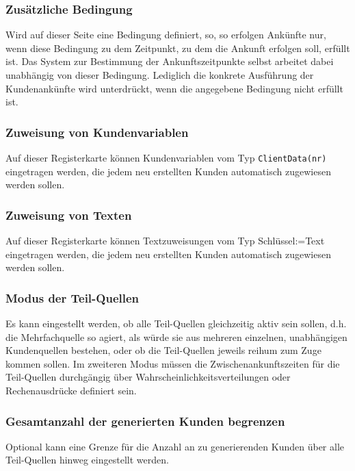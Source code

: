 \subsubsection*{Zusätzliche Bedingung}

Wird auf dieser Seite eine Bedingung definiert, so, so erfolgen Ankünfte nur, wenn diese Bedingung
zu dem Zeitpunkt, zu dem die Ankunft erfolgen soll, erfüllt ist.
Das System zur Bestimmung der Ankunftszeitpunkte selbst arbeitet dabei unabhängig von dieser Bedingung.
Lediglich die konkrete Ausführung der Kundenankünfte wird unterdrückt, wenn die angegebene Bedingung nicht erfüllt ist.

\subsubsection*{Zuweisung von Kundenvariablen}

Auf dieser Registerkarte können Kundenvariablen vom Typ \texttt{ClientData(nr)} eingetragen werden,
die jedem neu erstellten Kunden automatisch zugewiesen werden sollen.

\subsubsection*{Zuweisung von Texten}

Auf dieser Registerkarte können Textzuweisungen vom Typ Schlüssel:=Text eingetragen werden,
die jedem neu erstellten Kunden automatisch zugewiesen werden sollen.

\subsubsection*{Modus der Teil-Quellen}

Es kann eingestellt werden, ob alle Teil-Quellen gleichzeitig aktiv sein sollen, d.h. die Mehrfachquelle
so agiert, als würde sie aus mehreren einzelnen, unabhängigen Kundenquellen bestehen, oder ob die Teil-Quellen
jeweils reihum zum Zuge kommen sollen. Im zweiteren Modus müssen die Zwischenankunftszeiten für die Teil-Quellen
durchgängig über Wahrscheinlichkeitsverteilungen oder Rechenausdrücke definiert sein.

\subsubsection*{Gesamtanzahl der generierten Kunden begrenzen}

Optional kann eine Grenze für die Anzahl an zu generierenden Kunden über alle Teil-Quellen hinweg
eingestellt werden.

